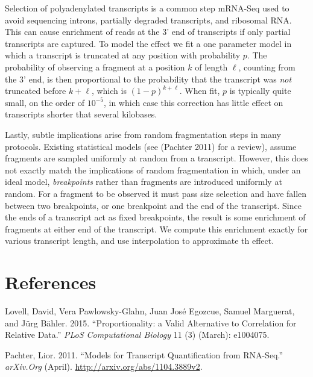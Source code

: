 \documentclass[twocolumn]{article}
\begin{document}
Selection of polyadenylated transcripts is a common step mRNA-Seq used
to avoid sequencing introns, partially degraded transcripts, and
ribosomal RNA. This can cause enrichment of reads at the 3' end of
transcripts if only partial transcripts are captured. To model the
effect we fit a one parameter model in which a transcript is truncated
at any position with probability $p$. The probability of observing a
fragment at a position $k$ of length $\ell$, counting from the 3' end,
is then proportional to the probability that the transcript was
\emph{not} truncated before $k + \ell$, which is $(1-p)^{k + \ell}$.
When fit, $p$ is typically quite small, on the order of $10^{-5}$, in
which case this correction has little effect on transcripts shorter that
several kilobases.

Lastly, subtle implications arise from random fragmentation steps in
many protocols. Existing statistical models (see (Pachter 2011) for a
review), assume fragments are sampled uniformly at random from a
transcript. However, this does not exactly match the implications of
random fragmentation in which, under an ideal model, \emph{breakpoints}
rather than fragments are introduced uniformly at random. For a fragment
to be observed it must pass size selection and have fallen between two
breakpoints, or one breakpoint and the end of the transcript. Since the
ends of a transcript act as fixed breakpoints, the result is some
enrichment of fragments at either end of the transcript. We compute this
enrichment exactly for various transcript length, and use interpolation
to approximate th effect.

\section{References}\label{references}

Lovell, David, Vera Pawlowsky-Glahn, Juan Jos{é} Egozcue, Samuel
Marguerat, and J{ü}rg B{ä}hler. 2015. ``Proportionality: a Valid
Alternative to Correlation for Relative Data.'' \emph{PLoS Computational
Biology} 11 (3) (March): e1004075.

Pachter, Lior. 2011. ``Models for Transcript Quantification from
RNA-Seq.'' \emph{arXiv.Org} (April).
\url{http://arxiv.org/abs/1104.3889v2}.
\end{document}
